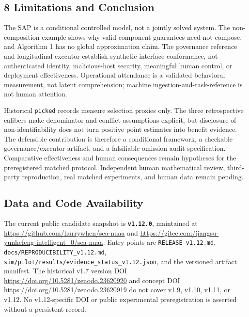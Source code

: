 \documentclass[
  11pt]{article}
\begin{document}
\subsection{8 Limitations and
Conclusion}\label{limitations-and-conclusion}

The SAP is a conditional controlled model, not a jointly solved system.
The non-composition example shows why valid component guarantees need
not compose, and Algorithm 1 has no global approximation claim. The
governance reference and longitudinal executor establish synthetic
interface conformance, not authenticated identity, malicious-host
security, meaningful human control, or deployment effectiveness.
Operational attendance is a validated behavioral measurement, not latent
comprehension; machine ingestion-and-task-reference is not human
attention.

Historical \texttt{picked} records measure selection proxies only. The
three retrospective calibers make denominator and conflict assumptions
explicit, but disclosure of non-identifiability does not turn positive
point estimates into benefit evidence. The defensible contribution is
therefore a conditional framework, a checkable governance/executor
artifact, and a falsifiable omission-audit specification. Comparative
effectiveness and human consequences remain hypotheses for the
preregistered matched protocol. Independent human mathematical review,
third-party reproduction, real matched experiments, and human data
remain pending.

\subsection{Data and Code
Availability}\label{data-and-code-availability}

The current public candidate snapshot is \textbf{\texttt{v1.12.0}},
maintained at \url{https://github.com/hurrywhen/sea-nuaa} and
\url{https://gitee.com/jiangsu-yunhefeng-intelligent_0/sea-nuaa}. Entry
points are \texttt{RELEASE\_v1.12.md},
\texttt{docs/REPRODUCIBILITY\_v1.12.md},
\texttt{sim/pilot/results/evidence\_status\_v1.12.json}, and the
versioned artifact manifest. The historical v1.7 version DOI
\url{https://doi.org/10.5281/zenodo.23620920} and concept DOI
\url{https://doi.org/10.5281/zenodo.23620919} do not cover v1.9, v1.10,
v1.11, or v1.12. No v1.12-specific DOI or public experimental
preregistration is asserted without a persistent record.
\end{document}
